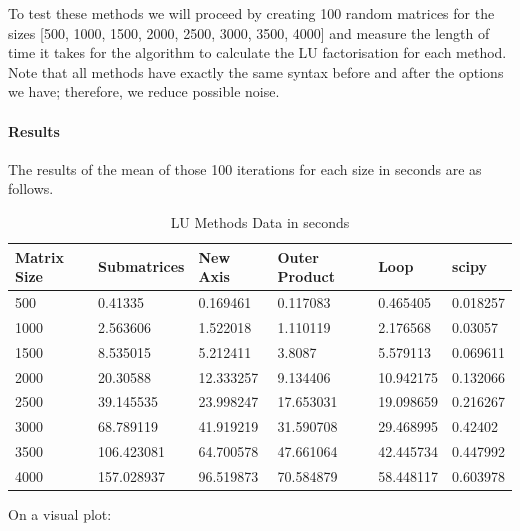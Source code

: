To test these methods we will proceed by creating 100 random matrices for the sizes [500, 1000, 1500, 2000, 2500, 3000, 3500, 4000] and measure the length of time it takes for the algorithm to calculate the LU factorisation for each method. Note that all methods have exactly the same syntax before and after the options we have; therefore, we reduce possible noise.
\paragraph{Results}
The results of the mean of those 100 iterations for each size in seconds are as follows. 
\begin{table}[H]
    \centering
    \begin{tabular}{|l|l|l|l|l|l|}
    \hline
        \textbf{Matrix Size} & \textbf{Submatrices} & \textbf{New Axis} & \textbf{Outer Product} & \textbf{Loop} & \textbf{scipy} \\ \hline
        500 & 0.41335 & 0.169461 & 0.117083 & 0.465405 & 0.018257 \\ \hline
        1000 & 2.563606 & 1.522018 & 1.110119 & 2.176568 & 0.03057 \\ \hline
        1500 & 8.535015 & 5.212411 & 3.8087 & 5.579113 & 0.069611 \\ \hline
        2000 & 20.30588 & 12.333257 & 9.134406 & 10.942175 & 0.132066 \\ \hline
        2500 & 39.145535 & 23.998247 & 17.653031 & 19.098659 & 0.216267 \\ \hline
        3000 & 68.789119 & 41.919219 & 31.590708 & 29.468995 & 0.42402 \\ \hline
        3500 & 106.423081 & 64.700578 & 47.661064 & 42.445734 & 0.447992 \\ \hline
        4000 & 157.028937 & 96.519873 & 70.584879 & 58.448117 & 0.603978 \\ \hline
    \end{tabular}
    \caption{LU Methods Data in seconds}
\end{table}

On a visual plot:

